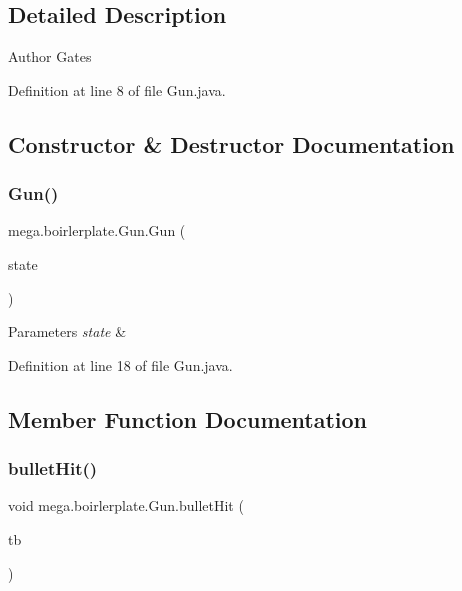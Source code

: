 \subsection{Detailed Description}
\begin{DoxyAuthor}{Author}
Gates 
\end{DoxyAuthor}


Definition at line 8 of file Gun.\+java.



\subsection{Constructor \& Destructor Documentation}
\mbox{\label{classmega_1_1boirlerplate_1_1_gun_a023388651f9929428cdc9519a5b16a42}} 
\subsubsection{\texorpdfstring{Gun()}{Gun()}}
{\footnotesize\ttfamily mega.\+boirlerplate.\+Gun.\+Gun (\begin{DoxyParamCaption}\item[{\hyperlink{classmega_1_1boirlerplate_1_1_state}{State}}]{state }\end{DoxyParamCaption})}


\begin{DoxyParams}{Parameters}
{\em state} & \\
\hline
\end{DoxyParams}


Definition at line 18 of file Gun.\+java.



\subsection{Member Function Documentation}
\mbox{\label{classmega_1_1boirlerplate_1_1_gun_a5d2c92e177f15f759fa0f7041189704b}} 
\subsubsection{\texorpdfstring{bullet\+Hit()}{bulletHit()}}
{\footnotesize\ttfamily void mega.\+boirlerplate.\+Gun.\+bullet\+Hit (\begin{DoxyParamCaption}\item[{\hyperlink{classmega_1_1boirlerplate_1_1_bullet_tracked}{Bullet\+Tracked}}]{tb }\end{DoxyParamCaption})}


